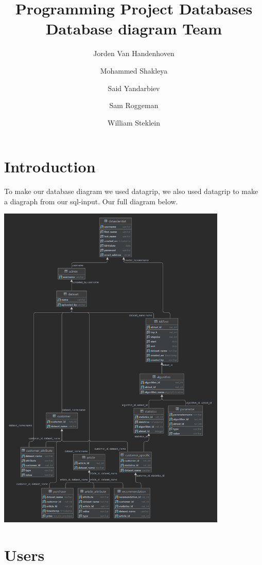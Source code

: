 \documentclass[a4paper,12pt]{article}
\title{\textbf{Programming Project Databases \\ Database diagram Team \teamnr}}
\author{Jorden Van Handenhoven\and Mohammed Shakleya\and Said Yandarbiev\and Sam Roggeman\and William Steklein}
\begin{document}
		
	\maketitle
	
		
	
	\tableofcontents
	\pagebreak
	\section{Introduction}
	To make our database diagram we used datagrip, we also used datagrip to make a diagraph from our sql-input. Our full diagram below.\\ 
	\begin{center}
  		\includegraphics[height=600px]{FullDiagraph.png}
\end{center}
\restoregeometry     
	\pagebreak
	\section{Users}
\end{document}
